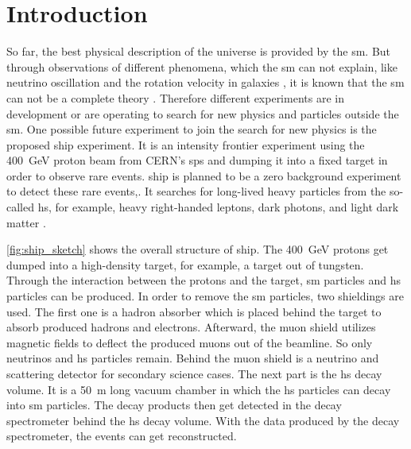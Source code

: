 \chapter{Introduction}



So far, the best physical description of the universe is provided by the \ac{sm}.
But through observations of different phenomena, which the \ac{sm} can not explain, like neutrino oscillation \cite{} and the rotation velocity in galaxies \cite{}, it is known that the \ac{sm} can not be a complete theory \cite{}.
Therefore different experiments are in development or are operating to search for new physics and particles outside the \ac{sm}.
One possible future experiment to join the search for new physics is the proposed \ac{ship} experiment.
It is an intensity frontier experiment using the \SI{400}{\giga\electronvolt} proton beam from CERN's \ac{sps} and dumping it into a fixed target in order to observe rare events.
\ac{ship} is planned to be a zero background experiment to detect these rare events,.
It searches for long-lived heavy particles from the so-called \ac{hs}, for example, heavy right-handed leptons, dark photons, and light dark matter \cite{}.

\autoref{fig:ship_sketch} shows the overall structure of \ac{ship}.
The \SI{400}{\giga\electronvolt} protons get dumped into a high-density target, for example, a target out of tungsten.
Through the interaction between the protons and the target, \ac{sm} particles and \ac{hs} particles can be produced.
In order to remove the \ac{sm} particles, two shieldings are used.
The first one is a hadron absorber which is placed behind the target to absorb produced hadrons and electrons.
Afterward, the muon shield utilizes magnetic fields to deflect the produced muons out of the beamline.
So only neutrinos and \ac{hs} particles remain.
Behind the muon shield is a neutrino and scattering detector for secondary science cases.
The next part is the \ac{hs} decay volume.
It is a \SI{50}{\meter} long vacuum chamber in which the \ac{hs} particles can decay into \ac{sm} particles.
The decay products then get detected in the decay spectrometer behind the \ac{hs} decay volume.
With the data produced by the decay spectrometer, the events can get reconstructed.


